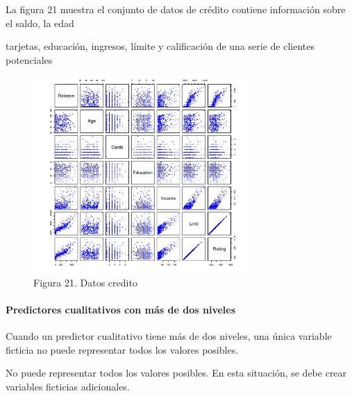 \documentclass[
  letterpaper,
  DIV=11,
  numbers=noendperiod]{scrartcl}
\let\oldparagraph\paragraph
\renewcommand{\paragraph}[1]{\oldparagraph{#1}\mbox{}}
\begin{document}
La figura 21 muestra el conjunto de datos de crédito contiene
información sobre el saldo, la edad

tarjetas, educación, ingresos, límite y calificación de una serie de
clientes potenciales

\begin{figure}

{\centering \includegraphics[width=3.20833in,height=\textheight]{images/f21.png}

}

\caption{Figura 21. Datos credito}

\end{figure}

\hypertarget{predictores-cualitativos-con-muxe1s-de-dos-niveles}{%
\paragraph{\texorpdfstring{\textbf{Predictores cualitativos con más de
dos
niveles}}{Predictores cualitativos con más de dos niveles}}\label{predictores-cualitativos-con-muxe1s-de-dos-niveles}}

Cuando un predictor cualitativo tiene más de dos niveles, una única
variable ficticia no puede representar todos los valores posibles.

No puede representar todos los valores posibles. En esta situación, se
debe crear variables ficticias adicionales.
\end{document}
